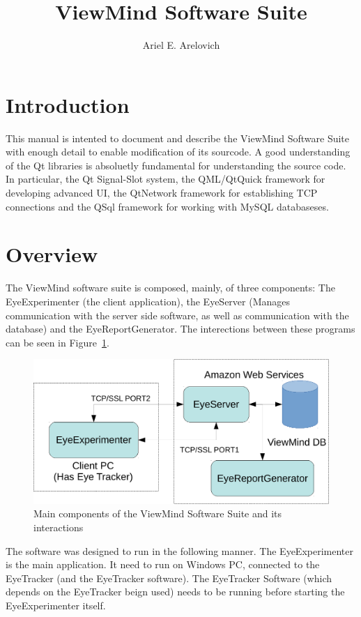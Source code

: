 \documentclass[a4paper,10pt]{article}
\title{ViewMind Software Suite}
\author{Ariel E. Arelovich}
\begin{document}
\maketitle

\section{Introduction}

This manual is intented to document and describe the ViewMind Software Suite with enough detail to enable modification of its sourcode. A good understanding of the Qt libraries is absoluetly fundamental for understanding the source code. In particular, the Qt Signal-Slot system, the QML/QtQuick framework for developing advanced UI, the QtNetwork framework for establishing TCP connections and the QSql framework for working with MySQL databaseses.


\section{Overview}

The ViewMind software suite is composed, mainly, of three components: The EyeExperimenter (the client application), the EyeServer (Manages communication with the server side software, as well as communication with the database) and the EyeReportGenerator. The interections between these programs can be seen in Figure~\ref{fig_overview}.

\begin{figure}[!h]
\centering
\includegraphics[scale = 0.5]{overview-crop.pdf}
\caption{Main components of the ViewMind Software Suite and its interactions}
\label{fig_overview}
\end{figure}

The software was designed to run in the following manner. The EyeExperimenter is the main application. It need to run on Windows PC, connected to the EyeTracker (and the EyeTracker software). The EyeTracker Software (which depends on the EyeTracker beign used) needs to be running before starting the EyeExperimenter itself. 
\end{document}
